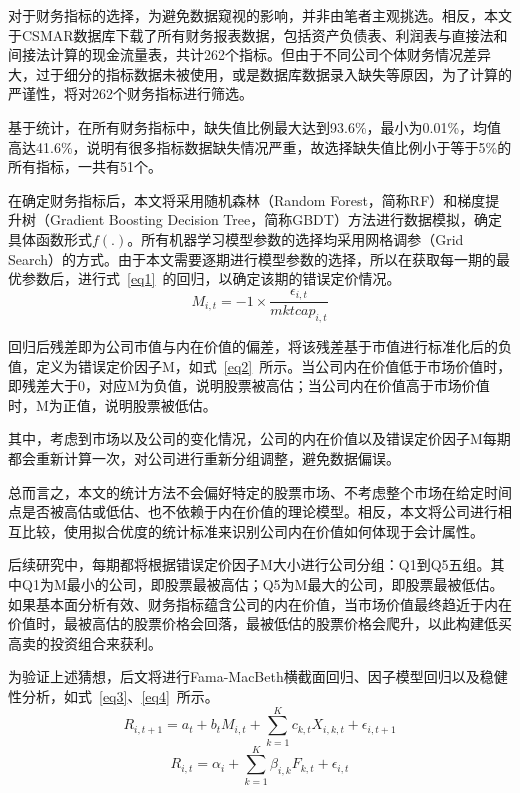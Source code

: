 对于财务指标的选择，为避免数据窥视的影响，并非由笔者主观挑选。相反，本文于CSMAR数据库下载了所有财务报表数据，包括资产负债表、利润表与直接法和间接法计算的现金流量表，共计262个指标。但由于不同公司个体财务情况差异大，过于细分的指标数据未被使用，或是数据库数据录入缺失等原因，为了计算的严谨性，将对262个财务指标进行筛选。

基于统计，在所有财务指标中，缺失值比例最大达到93.6\%，最小为0.01\%，均值高达41.6\%，说明有很多指标数据缺失情况严重，故选择缺失值比例小于等于5\%的所有指标，一共有51个。

在确定财务指标后，本文将采用随机森林（Random Forest，简称RF）和梯度提升树（Gradient Boosting Decision Tree，简称GBDT）方法进行数据模拟，确定具体函数形式$f(.)$。所有机器学习模型参数的选择均采用网格调参（Grid Search）的方式。由于本文需要逐期进行模型参数的选择，所以在获取每一期的最优参数后，进行式~\ref{eq1}~的回归，以确定该期的错误定价情况。
\begin{equation}
\label{eq2}
M_{i, t} =-1 \times \frac{\epsilon_{i, t}}{mktcap_{i, t}}
\end{equation}

回归后残差即为公司市值与内在价值的偏差，将该残差基于市值进行标准化后的负值，定义为错误定价因子M，如式~\ref{eq2}~所示。当公司内在价值低于市场价值时，即残差大于0，对应M为负值，说明股票被高估；当公司内在价值高于市场价值时，M为正值，说明股票被低估。

其中，考虑到市场以及公司的变化情况，公司的内在价值以及错误定价因子M每期都会重新计算一次，对公司进行重新分组调整，避免数据偏误。

总而言之，本文的统计方法不会偏好特定的股票市场、不考虑整个市场在给定时间点是否被高估或低估、也不依赖于内在价值的理论模型。相反，本文将公司进行相互比较，使用拟合优度的统计标准来识别公司内在价值如何体现于会计属性。

后续研究中，每期都将根据错误定价因子M大小进行公司分组：Q1到Q5五组。其中Q1为M最小的公司，即股票最被高估；Q5为M最大的公司，即股票最被低估。如果基本面分析有效、财务指标蕴含公司的内在价值，当市场价值最终趋近于内在价值时，最被高估的股票价格会回落，最被低估的股票价格会爬升，以此构建低买高卖的投资组合来获利。

为验证上述猜想，后文将进行Fama-MacBeth横截面回归、因子模型回归以及稳健性分析，如式~\ref{eq3}、\ref{eq4}~所示。
\begin{equation}
\label{eq3}
R_{i, t+1}=a_{t}+b_{t} M_{i, t}+\sum_{k=1}^{K} c_{k, t} X_{i, k, t}+\epsilon_{i, t+1}
\end{equation}
\begin{equation}
\label{eq4}
R_{i, t}=\alpha_{i}+\sum_{k=1}^{K} \beta_{i, k} F_{k, t}+\epsilon_{i, t}
\end{equation}

